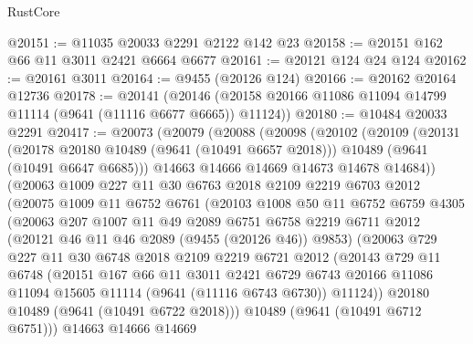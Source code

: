 \begin{lexlean}{RustCore}
\begin{coremodule}
@20151 := @11035 @20033 @2291 @2122 @142 @23
@20158 := @20151 @162 @66 @11 @3011 @2421 @6664 @6677
@20161 := @20121 @124 @24 @124
@20162 := @20161 @3011
@20164 := @9455 (@20126 @124)
@20166 := @20162 @20164 @12736
@20178 := @20141
    (@20146 (@20158 @20166 @11086 @11094 @14799 @11114 (@9641 (@11116 @6677 @6665)) @11124))
@20180 := @10484 @20033 @2291
@20417 := @20073
    (@20079
      (@20088
        (@20098
          (@20102
            (@20109
              (@20131
                (@20178 @20180 @10489 (@9641 (@10491 @6657 @2018)))
                @10489
                (@9641 (@10491 @6647 @6685)))
              @14663
              @14666
              @14669
              @14673
              @14678
              @14684))
          (@20063
            @1009
            @227
            @11
            @30
            @6763
            @2018
            @2109
            @2219
            @6703
            @2012
            (@20075
              @1009
              @11
              @6752
              @6761
              (@20103
                @1008
                @50
                @11
                @6752
                @6759
                @4305
                (@20063
                  @207
                  @1007
                  @11
                  @49
                  @2089
                  @6751
                  @6758
                  @2219
                  @6711
                  @2012
                  (@20121 @46 @11 @46 @2089 (@9455 (@20126 @46)) @9853)
                  (@20063
                    @729
                    @227
                    @11
                    @30
                    @6748
                    @2018
                    @2109
                    @2219
                    @6721
                    @2012
                    (@20143
                      @729
                      @11
                      @6748
                      (@20151
                        @167
                        @66
                        @11
                        @3011
                        @2421
                        @6729
                        @6743
                        @20166
                        @11086
                        @11094
                        @15605
                        @11114
                        (@9641 (@11116 @6743 @6730))
                        @11124))
                    @20180
                    @10489
                    (@9641 (@10491 @6722 @2018)))
                  @10489
                  (@9641 (@10491 @6712 @6751)))
                @14663
                @14666
                @14669

\end{coremodule}
\end{lexlean}
